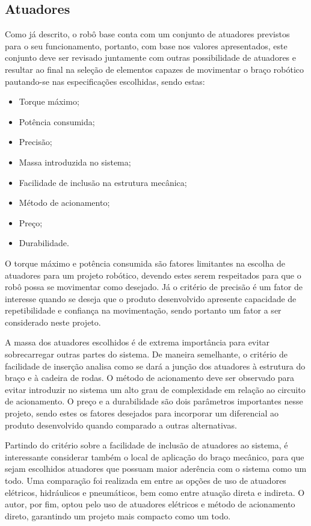 
\subsection{Atuadores}

Como já descrito, o robô base conta com um conjunto de atuadores 
previstos para o seu funcionamento, portanto, com base nos valores 
apresentados, este conjunto deve ser revisado juntamente com outras 
possibilidade de atuadores e resultar ao final na seleção de elementos 
capazes de movimentar o braço robótico pautando-se nas especificações 
escolhidas, sendo estas: 

\begin{itemize}
    \item Torque máximo;
    \item Potência consumida;
    \item Precisão;
    \item Massa introduzida no sistema;
    \item Facilidade de inclusão na estrutura mecânica;
    \item Método de acionamento;
    \item Preço;
    \item Durabilidade.
\end{itemize}

O torque máximo e potência consumida são fatores limitantes na escolha de atuadores
para um projeto robótico, devendo estes serem respeitados para que o robô possa
se movimentar como desejado. Já o critério de precisão é um fator de interesse 
quando se deseja que o produto desenvolvido apresente capacidade de repetibilidade e 
confiança na movimentação, sendo portanto um fator a ser considerado neste projeto.

A massa dos atuadores escolhidos é de extrema importância para evitar sobrecarregar 
outras partes do sistema. De maneira semelhante, o critério de facilidade 
de inserção analisa como se dará a junção dos atuadores à estrutura do 
braço e à cadeira de rodas. O método de acionamento deve ser observado 
para evitar introduzir no sistema um alto grau de complexidade em relação 
ao circuito de acionamento. O preço e a durabilidade são dois parâmetros 
importantes nesse projeto, sendo estes os fatores desejados para incorporar
um diferencial ao produto desenvolvido quando comparado a outras alternativas.

Partindo do critério sobre a facilidade de inclusão de atuadores ao sistema, 
é interessante considerar também o local de aplicação do braço mecânico, 
para que sejam escolhidos atuadores que possuam maior aderência com o 
sistema como um todo. 
Uma comparação foi realizada em \cite{fernando2019assistivo} entre as 
opções de uso de atuadores elétricos, hidráulicos e pneumáticos, bem como
entre atuação direta e indireta. O autor, por fim, optou pelo uso de 
atuadores elétricos e método de acionamento direto, garantindo um projeto
mais compacto como um todo.

